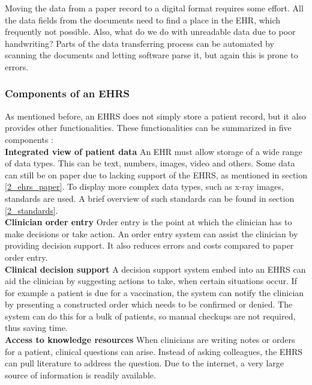         Moving the data from a paper record to a digital format requires some effort. All the data fields from the documents need to find a place in the EHR, which frequently not possible. Also, what do we do with unreadable data due to poor handwriting? Parts of the data transferring process can be automated by scanning the documents and letting software parse it, but again this is prone to errors.

        \subsubsection{Components of an EHRS}

        As mentioned before, an EHRS does not simply store a patient record, but it also provides other functionalities. These functionalities can be summarized in five components \cite{biomedical_informatics}:\\

        \noindent\textbf{Integrated view of patient data} An EHR must allow storage of a wide range of data types. This can be text, numbers, images, video and others. Some data can still be on paper due to lacking support of the EHRS, as mentioned in section \ref{2_ehrs_paper}. To display more complex data types, such as x-ray images, standards are used. A brief overview of such standards can be found in section \ref{2_standards}.\\

        \noindent\textbf{Clinician order entry} Order entry is the point at which the clinician has to make decisions or take action. An order entry system can assist the clinician by providing decision support. It also reduces errors and costs compared to paper order entry.\\

        \noindent\textbf{Clinical decision support} A decision support system embed into an EHRS can aid the clinician by suggesting actions to take, when certain situations occur. If for example a patient is due for a vaccination, the system can notify the clinician by presenting a constructed order which needs to be confirmed or denied. The system can do this for a bulk of patients, so manual checkups are not required, thus saving time.\\

        \noindent\textbf{Access to knowledge resources} When clinicians are writing notes or orders for a patient, clinical questions can arise. Instead of asking colleagues, the EHRS can pull literature to address the question. Due to the internet, a very large source of information is readily available.\\

